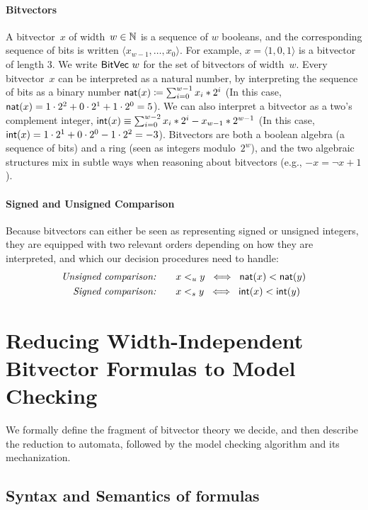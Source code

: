 \paragraph{Bitvectors}
A bitvector~$x$ of width~$w \in \mathbb N$ is a sequence of $w$ booleans, and the
corresponding sequence of bits is written $\langle x_{w-1}, \ldots, x_0
\rangle$. For example, $x = \langle 1, 0, 1 \rangle$ is a bitvector of length 3.
%
We write $\mathsf{BitVec}~{w}$ for the set of bitvectors of width~$w$.
%
Every bitvector~$x$ can be interpreted as a natural number, by interpreting the
sequence of bits as a binary number $\textsf{nat}(x) \coloneqq \sum_{i=0}^{w-1} x_i *
2^i$ (In this case, $\textsf{nat}(x) = 1 \cdot 2^2 + 0 \cdot 2^1 + 1 \cdot 2^0 =
5$). We can also interpret a bitvector as a two's complement integer,
$\textsf{int}(x) \equiv \sum_{i=0}^{w-2} x_i * 2^i - x_{w-1} * 2^{w-1}$ (In this
case, $\textsf{int}(x) = 1 \cdot 2^1 + 0 \cdot 2^0 - 1 \cdot 2^2 = -3$). Bitvectors
are both a boolean algebra (a sequence of bits) and a ring (seen as integers
modulo~$2^w$), and the two algebraic structures mix in subtle ways when reasoning
about bitvectors (e.g., $-x = \lnot x + 1$).

\paragraph{Signed and Unsigned Comparison}
Because bitvectors can either be seen as representing signed or unsigned
integers, they are equipped with two relevant orders depending on how they are
interpreted, and which our decision procedures need to handle:
\begin{align*}
  \textit{Unsigned comparison:}&\qquad x <_u y \;\iff\; \textsf{nat}(x) < \textsf{nat}(y) \\
  \textit{Signed comparison:}&\qquad x <_s y \;\iff\; \textsf{int}(x) < \textsf{int}(y)
\end{align*}

\section{Reducing Width-Independent Bitvector Formulas to Model Checking}
\label{sec:swbv:reduction}

We formally define the fragment of bitvector theory we decide,
and then describe the reduction to automata, followed by the model checking algorithm and its mechanization.

\subsection{Syntax and Semantics of formulas}
\label{sec:swbv:formulas}

